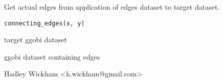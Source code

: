 \begin{Description}\relax
Get actual edges from application of edges dataset to target dataset.
\end{Description}
\begin{Usage}
\begin{verbatim}connecting_edges(x, y)\end{verbatim}
\end{Usage}
\begin{Arguments}
\begin{ldescription}
\item[\code{x}] target ggobi dataset
\item[\code{y}] ggobi dataset containing edges
\end{ldescription}
\end{Arguments}
\begin{Details}\relax
\end{Details}
\begin{Author}\relax
Hadley Wickham <h.wickham@gmail.com>
\end{Author}
\begin{Examples}
\begin{ExampleCode}\end{ExampleCode}
\end{Examples}

